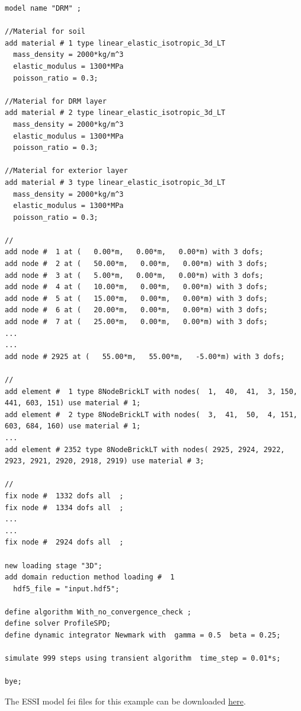 \documentclass[fleqn,11pt]{article}
\begin{document}
%
\begin{lstlisting}
model name "DRM" ;

//Material for soil
add material # 1 type linear_elastic_isotropic_3d_LT
  mass_density = 2000*kg/m^3
  elastic_modulus = 1300*MPa
  poisson_ratio = 0.3;

//Material for DRM layer
add material # 2 type linear_elastic_isotropic_3d_LT
  mass_density = 2000*kg/m^3
  elastic_modulus = 1300*MPa
  poisson_ratio = 0.3;

//Material for exterior layer
add material # 3 type linear_elastic_isotropic_3d_LT
  mass_density = 2000*kg/m^3
  elastic_modulus = 1300*MPa
  poisson_ratio = 0.3;

//
add node #  1 at (   0.00*m,   0.00*m,   0.00*m) with 3 dofs;
add node #  2 at (   50.00*m,   0.00*m,   0.00*m) with 3 dofs;
add node #  3 at (   5.00*m,   0.00*m,   0.00*m) with 3 dofs;
add node #  4 at (   10.00*m,   0.00*m,   0.00*m) with 3 dofs;
add node #  5 at (   15.00*m,   0.00*m,   0.00*m) with 3 dofs;
add node #  6 at (   20.00*m,   0.00*m,   0.00*m) with 3 dofs;
add node #  7 at (   25.00*m,   0.00*m,   0.00*m) with 3 dofs;
...
...
add node # 2925 at (   55.00*m,   55.00*m,   -5.00*m) with 3 dofs;

//
add element #  1 type 8NodeBrickLT with nodes(  1,  40,  41,  3, 150, 441, 603, 151) use material # 1;
add element #  2 type 8NodeBrickLT with nodes(  3,  41,  50,  4, 151, 603, 684, 160) use material # 1;
...
add element # 2352 type 8NodeBrickLT with nodes( 2925, 2924, 2922, 2923, 2921, 2920, 2918, 2919) use material # 3;

//
fix node #  1332 dofs all  ;
fix node #  1334 dofs all  ;
...
...
fix node #  2924 dofs all  ;

new loading stage "3D";
add domain reduction method loading #  1
  hdf5_file = "input.hdf5";

define algorithm With_no_convergence_check ;
define solver ProfileSPD;
define dynamic integrator Newmark with  gamma = 0.5  beta = 0.25;

simulate 999 steps using transient algorithm  time_step = 0.01*s;

bye;
\end{lstlisting}

The    ESSI   model   fei   files   for   this   example   can   be   downloaded
\href{https://github.com/BorisJeremic/Real-ESSI-Examples/blob/master/model_fei_file/8NodeBrick_DRM_3D/8NodeBrick_DRM_3D.tgz?raw=true}{here}.
\end{document}
